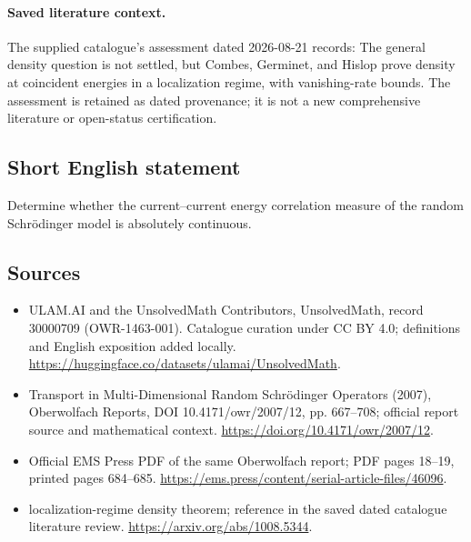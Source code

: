 \documentclass[11pt]{article}
\begin{document}
\paragraph{Saved literature context.} The supplied catalogue's assessment dated 2026-08-21 records: The general density question is not settled, but Combes, Germinet, and Hislop prove density at coincident energies in a localization regime, with vanishing-rate bounds. The assessment is retained as dated provenance; it is not a new comprehensive literature or open-status certification.
\subsection{Short English statement}
Determine whether the current--current energy correlation measure of the random Schrödinger model is absolutely continuous.
\subsection{Sources}
\begin{itemize}
\item[\hypertarget{source:30000709:1}{S1}] ULAM.AI and the UnsolvedMath Contributors, UnsolvedMath, record 30000709 (OWR-1463-001). Catalogue curation under CC BY 4.0; definitions and English exposition added locally.
\url{https://huggingface.co/datasets/ulamai/UnsolvedMath}.
\item[\hypertarget{source:30000709:2}{S2}] Transport in Multi-Dimensional Random Schrödinger Operators (2007), Oberwolfach Reports, DOI 10.4171/owr/2007/12, pp. 667--708; official report source and mathematical context.
\url{https://doi.org/10.4171/owr/2007/12}.
\item[\hypertarget{source:30000709:3}{S3}] Official EMS Press PDF of the same Oberwolfach report; PDF pages 18--19, printed pages 684--685.
\url{https://ems.press/content/serial-article-files/46096}.
\item[\hypertarget{source:30000709:4}{S4}] localization-regime density theorem; reference in the saved dated catalogue literature review.
\url{https://arxiv.org/abs/1008.5344}.
\end{itemize}
\label{end:30000709}
\end{document}
